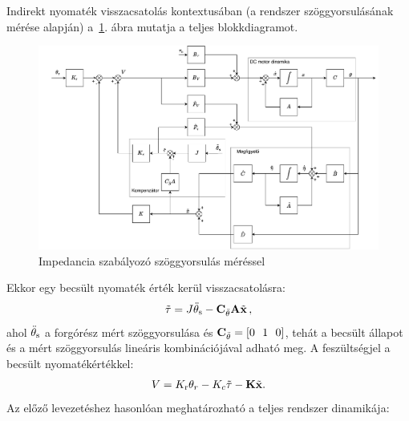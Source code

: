 Indirekt nyomaték visszacsatolás kontextusában (a rendszer szöggyorsulásának mérése alapján) 
a~\ref{fig:block_diagram_indirect_compensation}. ábra mutatja a teljes blokkdiagramot.
\begin{figure}[ht]
    \begin{center}
    \includegraphics[width=\textwidth]{images/compensated_position_controller_angular_acceleration.pdf}
    \caption{Impedancia szabályozó szöggyorsulás méréssel}\label{fig:block_diagram_indirect_compensation}
    \end{center}
\end{figure}
Ekkor egy becsült nyomaték érték kerül visszacsatolásra:
\begin{align}
    \tilde \tau = J \ddot \theta_{\mathrm{s}} - \mathbf{C}_{\ddot\theta} \mathbf{A} \tilde{\mathbf{x}}\,,
\end{align}
ahol \(\ddot \theta_{\mathrm{s}}\) a forgórész mért szöggyorsulása és \(\mathbf{C}_{\ddot\theta} = [0~~1~~0]\),
tehát a becsült állapot és a mért szöggyorsulás lineáris kombinációjával adható meg.
A feszültségjel a becsült nyomatékértékkel:
\begin{align}
    V = K_{\mathrm{r}} \theta_r - K_c \tilde \tau - \mathbf{K} \tilde{\mathbf{x}}.
\end{align}
Az előző levezetéshez hasonlóan meghatározható a teljes rendszer dinamikája:
